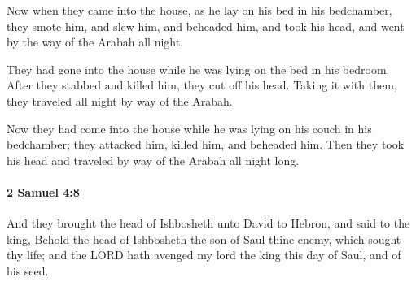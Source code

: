 			\begin{versebox}
					\item[BHS] 
					\item[ASV] Now when they came into the house, as he lay on his bed in his bedchamber, they smote him, and slew him, and beheaded him, and took his head, and went by the way of the Arabah all night.
					\item[NIV] They had gone into the house while he was lying on the bed in his bedroom. After they stabbed and killed him, they cut off his head. Taking it with them, they traveled all night by way of the Arabah.
					\item[NRSV] Now they had come into the house while he was lying on his couch in his bedchamber; they attacked him, killed him, and beheaded him. Then they took his head and traveled by way of the Arabah all night long.
			\end{versebox}

		\paragraph{2 Samuel 4:8} %
			\label{2SAMUEL-4-8}

			And they brought the head of Ishbosheth unto David to Hebron, and said to the king, Behold the head of Ishbosheth the son of Saul thine enemy, which sought thy life; and the LORD hath avenged my lord the king this day of Saul, and of his seed.

